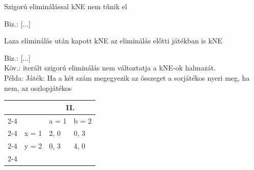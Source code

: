 	\begin{statement}{}{}
		Szigorú eliminálással kNE nem tűnik el
	\end{statement}
	
	Biz.: [...]
	
	\begin{statement}{}{}
		Laza eliminálás után kapott kNE az eliminálás előtti játékban is kNE
	\end{statement}
	
	Biz.: [...] \\
	
	Köv.: iterált szigorú eliminálás nem változtatja a kNE-ok halmazát. \\ 
	
	Példa: Játék: Ha a két szám megegyezik az összeget a sorjátékos nyeri meg, ha nem, az oszlopjátékos
	
	\begin{center}
		\begin{tabular}{llll}
			&                            & \multicolumn{2}{c}{II.}                                 \\ \cline{2-4} 
			\multicolumn{1}{l|}{}   & \multicolumn{1}{l|}{}      & \multicolumn{1}{l|}{a = 1} & \multicolumn{1}{l|}{b = 2} \\ \cline{2-4} 
			\multicolumn{1}{l|}{I.} & \multicolumn{1}{l|}{x = 1} & \multicolumn{1}{l|}{2, 0}  & \multicolumn{1}{l|}{0, 3}  \\ \cline{2-4} 
			\multicolumn{1}{l|}{}   & \multicolumn{1}{l|}{y = 2} & \multicolumn{1}{l|}{0, 3}  & \multicolumn{1}{l|}{4, 0}  \\ \cline{2-4} 
		\end{tabular}
	\end{center}
	
